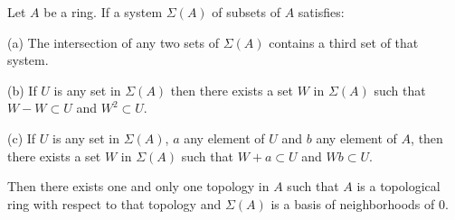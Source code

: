 Let $A$ be a ring. If a system $\Sigma(A)$ of subsets of $A$ satisfies:

(a) The intersection of any two sets of $\Sigma(A)$ contains a third set of that system.

(b) If $U$ is any set in $\Sigma(A)$ then there exists a set $W$ in $\Sigma(A)$ such that $W - W \subset U$ and $W^2 \subset U$.

(c) If $U$ is any set in $\Sigma(A)$, $a$ any element of $U$ and $b$ any element of $A$, then there exists a set $W$ in $\Sigma(A)$ such that $W + a \subset U$ and $Wb \subset U$.

Then there exists one and only one topology in $A$ such that $A$ is a topological ring with respect to that topology and $\Sigma(A)$ is a basis of neighborhoods of $0$.